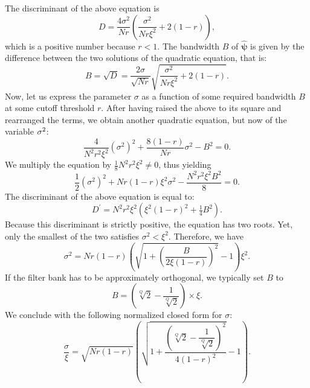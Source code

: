\documentclass[smallextended]{svjour3}
\begin{document}
The discriminant of the above equation is
\[
D=\dfrac{4\sigma^2}{Nr}
\left(
\dfrac{\sigma^2}{Nr\xi^2}
+
2(1-r)
\right),
\]
which is a positive number because $r<1$.
The bandwidth $B$ of $\boldsymbol{\hat{\psi}}$ is given by the difference between the two solutions of the quadratic equation, that is:
\[
B = 
\sqrt{D} =
\dfrac{2\sigma}{\sqrt{N r}}
\sqrt{\dfrac{\sigma^2}{N r \xi^2} + 2 (1-r)}
.
\]
Now, let us express the parameter $\sigma$ as a function of some
required bandwidth $B$ at some cutoff threshold $r$. After having
raised the above to its square and rearranged the terms, we obtain
another quadratic equation, but now of the variable $\mbox{\ensuremath{\sigma}}^{2}$:
\[
\dfrac{4}{N^2 r^2 \xi^2} (\sigma^2)^2 + \dfrac{8 (1-r)}{N r} \sigma^2 - B^2 = 0.
\]
We multiply the equation by $\tfrac{1}{8} N^2 r^2 \xi^2 \neq 0$, thus yielding
\[
\dfrac{1}{2} (\sigma^2)^2
+
N r (1-r) \xi^2 \sigma^2
-
\dfrac{N^2 r^2 \xi^2 B^2}{8}
= 0.
\]
The discriminant of the above equation is equal to:
\[
D^\prime = N^2 r^2 \xi^2 \left(\xi^2 (1-r)^2 + \tfrac{1}{4}B^2\right).
\]
Because this discriminant is strictly positive, the equation has two roots.
Yet, only the smallest of the two satisfies $\sigma^2 < \xi^2$.
Therefore, we have
\[
\sigma^{2}=
N r (1-r)
\left(
\sqrt{1 + \left(\dfrac{B}{2\xi (1-r)}\right)^2}
- 1\right) \xi^2 
.
\]
If the filter bank has to be approximately orthogonal, we typically
set $B$ to
\[
B = 
\left(\sqrt[Q]{2} - \dfrac{1}{\sqrt[Q]{2}} \right)
\times \xi.
\]
We conclude with the following normalized closed form for $\sigma$:
\[
\dfrac{\sigma}{\xi} = \sqrt{N r (1-r)}
\left(
\sqrt{
1 +
\dfrac{\left(\sqrt[Q]{2} - \dfrac{1}{\sqrt[Q]{2}} \right)^2}{
4 (1-r)^2
}}
- 1\right).
\]
\end{document}
